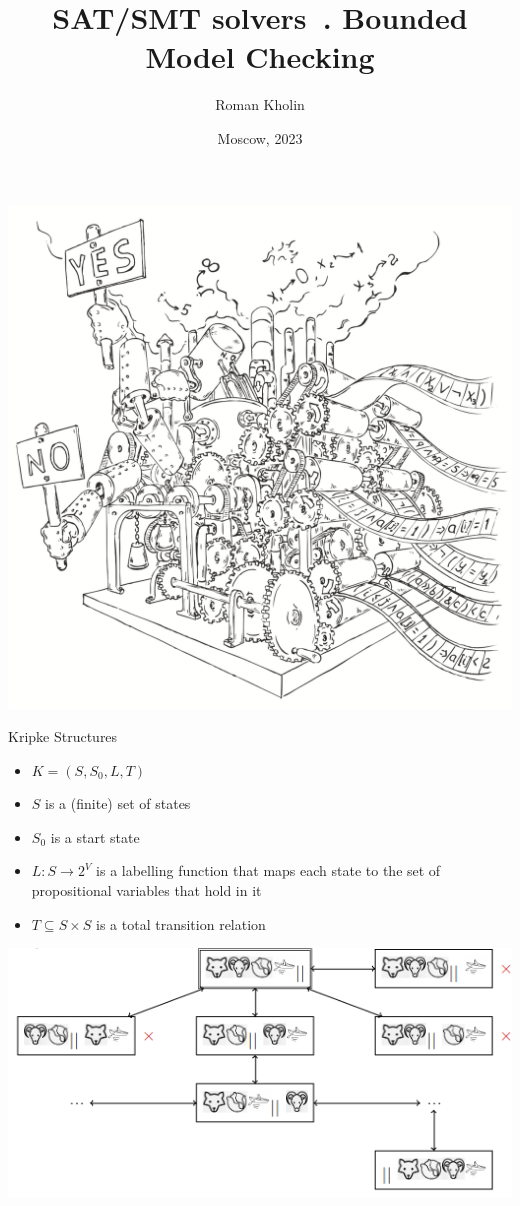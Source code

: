 \documentclass{beamer}
\begin{document}
\title{SAT/SMT solvers\ . Bounded Model Checking}
\author{Roman Kholin}
\date{Moscow, 2023}

\begin{frame}
\includegraphics[scale=0.5]{../decision-procedure.png}
\end{frame}

\frame{\titlepage}

\begin{frame}{Kripke Structures}
\begin{itemize}
\item $K = (S, S_0, L, T)$
\item $S$ is a (finite) set of states
\item $S_0$ is a start state
\item $L: S \rightarrow 2^V$ is a labelling function that maps each state to the set of propositional variables that hold in it
\item $T \subseteq S\times S$ is a total transition relation
\end{itemize}
\includegraphics[scale=0.5]{wolf.png}
\end{frame}
\end{document}
